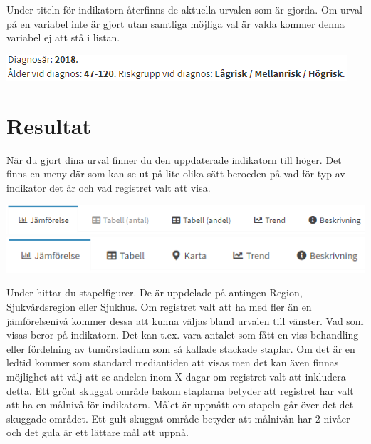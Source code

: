 \documentclass[10pt, a4paper,twoside]{report}
\begin{document}
Under titeln för indikatorn återfinns de aktuella urvalen som är gjorda. Om urval på en variabel inte är gjort utan samtliga möjliga val är valda kommer denna variabel ej att stå i listan.

\includegraphics[]{figurer/Urvalstext}
\newline

\section{Resultat}
När du gjort dina urval finner du den uppdaterade indikatorn till höger. Det finns en meny där som kan se ut på lite olika sätt beroeden på vad för typ av indikator det är och vad registret valt att visa.

\includegraphics[]{figurer/Grafval1}\newline
{}
\includegraphics[]{figurer/Grafval2}
\newline

Under \textcolor{useblue}{\selectfont{Jämförelse}} hittar du stapelfigurer. De är uppdelade på antingen Region, Sjukvårdsregion eller Sjukhus. Om registret valt att ha med fler än en jämförelsenivå kommer dessa att kunna väljas bland urvalen till vänster. Vad som visas beror på indikatorn. Det kan t.ex. vara antalet som fått en viss behandling eller fördelning av tumörstadium som så kallade stackade staplar. Om det är en ledtid kommer som standard mediantiden att visas men det kan även finnas möjlighet att välj att se andelen inom X dagar om registret valt att inkludera detta. \newline
Ett grönt skuggat område bakom staplarna betyder att registret har valt att ha en målnivå för indikatorn. Målet är uppnått om stapeln går över det det skuggade området. Ett gult skuggat område betyder att målnivån har 2 nivåer och det gula är ett lättare mål att uppnå.
\end{document}
